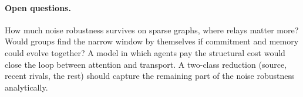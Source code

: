 \paragraph{Open questions.} How much noise robustness survives on sparse graphs, where relays matter more? Would groups find
the narrow window by themselves if commitment and memory could evolve together? A model in which agents pay the
structural cost would close the loop between attention and transport. A two-class reduction (source, recent rivals, the
rest) should capture the remaining part of the noise robustness analytically.
